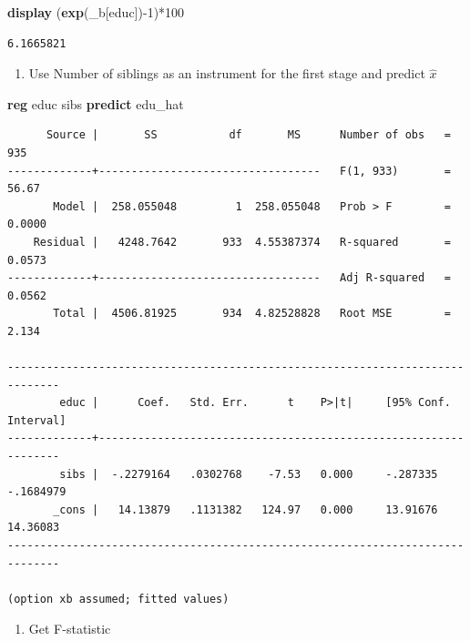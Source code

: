 \documentclass[
]{book}
\newenvironment{Shaded}{\begin{snugshade}}{\end{snugshade}}
\newcommand{\FunctionTok}[1]{\textcolor[rgb]{0.13,0.29,0.53}{\textbf{#1}}}
\newcommand{\KeywordTok}[1]{\textcolor[rgb]{0.13,0.29,0.53}{\textbf{#1}}}
\newcommand{\NormalTok}[1]{#1}
\providecommand{\tightlist}{%
  \setlength{\itemsep}{0pt}\setlength{\parskip}{0pt}}
\begin{document}
\begin{Shaded}
\begin{Highlighting}[]
\KeywordTok{display}\NormalTok{ (}\FunctionTok{exp}\NormalTok{(\_b[educ]){-}1)*100}
\end{Highlighting}
\end{Shaded}

\begin{verbatim}
6.1665821
\end{verbatim}

\begin{enumerate}
\def\labelenumi{\arabic{enumi})}
\setcounter{enumi}{1}
\tightlist
\item
  Use Number of siblings as an instrument for the first stage and predict \(\hat{x}\)
\end{enumerate}

\begin{Shaded}
\begin{Highlighting}[]
\KeywordTok{reg}\NormalTok{ educ sibs}
\KeywordTok{predict}\NormalTok{ edu\_hat}
\end{Highlighting}
\end{Shaded}

\begin{verbatim}
      Source |       SS           df       MS      Number of obs   =       935
-------------+----------------------------------   F(1, 933)       =     56.67
       Model |  258.055048         1  258.055048   Prob > F        =    0.0000
    Residual |   4248.7642       933  4.55387374   R-squared       =    0.0573
-------------+----------------------------------   Adj R-squared   =    0.0562
       Total |  4506.81925       934  4.82528828   Root MSE        =     2.134

------------------------------------------------------------------------------
        educ |      Coef.   Std. Err.      t    P>|t|     [95% Conf. Interval]
-------------+----------------------------------------------------------------
        sibs |  -.2279164   .0302768    -7.53   0.000     -.287335   -.1684979
       _cons |   14.13879   .1131382   124.97   0.000     13.91676    14.36083
------------------------------------------------------------------------------

(option xb assumed; fitted values)
\end{verbatim}

\begin{enumerate}
\def\labelenumi{\arabic{enumi})}
\setcounter{enumi}{2}
\tightlist
\item
  Get F-statistic
\end{enumerate}
\end{document}
